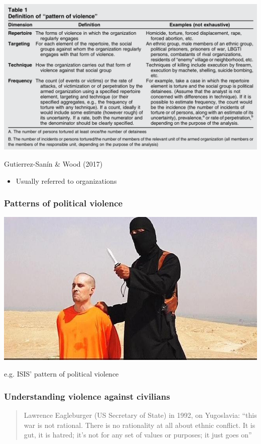 \documentclass[utf8, xcolor=dvipsnames, handout]{beamer}
\begin{document}
\begin{frame}
\includegraphics[width = \textwidth]{img/pattern_of_pv}

{\footnotesize Gutierrez-Sanín \& Wood (2017)}

\begin{itemize}
  \item Usually referred to organizations
\end{itemize}

\end{frame}

\begin{frame}
\frametitle{Patterns of political violence}
\centering

\includegraphics[width = \textwidth]{img/foley}

e.g. ISIS' pattern of political violence

\end{frame}

\begin{frame}
\frametitle{Understanding violence against civilians}
\centering

\begin{quote}
{\normalfont Lawrence Eagleburger (US Secretary of State) in 1992, on Yugoslavia:} ``this war is not rational. There is no rationality at all about ethnic conflict. It is gut, it is hatred; it’s not for any set of values or purposes; it just goes on''
\end{quote}

\end{frame}
\end{document}

